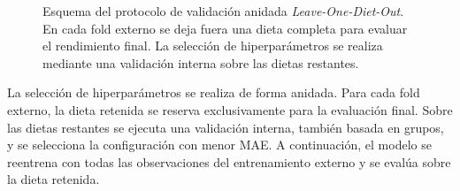 \begin{figure}[htbp]
{%
    }
     \caption{Esquema del protocolo de validación anidada \emph{Leave-One-Diet-Out}. En cada fold externo se deja fuera una dieta completa para evaluar el rendimiento final. La selección de hiperparámetros se realiza mediante una validación interna sobre las dietas restantes.}
    \label{fig:nested_lodo}
\end{figure}
\FloatBarrier

La selección de hiperparámetros se realiza de forma anidada. Para cada fold externo, la dieta retenida se reserva exclusivamente para la evaluación final. Sobre las dietas restantes se ejecuta una validación interna, también basada en grupos, y se selecciona la configuración con menor MAE. A continuación, el modelo se reentrena con todas las observaciones del entrenamiento externo y se evalúa sobre la dieta retenida.

